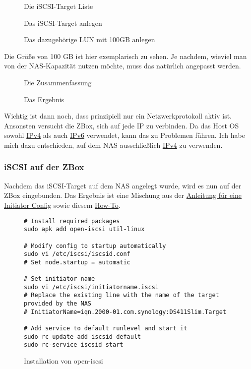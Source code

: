 \documentclass[12pt,a4paper,ngerman]{article}
\newcommand{\jpaimg}[2]{\begin{figure}[H]\centering\fbox{\texttt{[image: \#1]}}\caption{#2}\label{fig:#2}\end{figure}}
\newcommand{\jpacaption}[1]{\caption{#1}\label{fig:#1}}
\begin{document}
\jpaimg{./images/DSM-ISCSI-02.png}{Die iSCSI-Target Liste}

\jpaimg{./images/DSM-ISCSI-03.png}{Das iSCSI-Target anlegen}

\jpaimg{./images/DSM-ISCSI-04.png}{Das dazugehörige LUN mit 100GB anlegen}

Die Größe von 100 GB ist hier exemplarisch zu sehen. Je nachdem, wieviel man
von der NAS-Kapazität nutzen möchte, muss das natürlich angepasst werden.

\jpaimg{./images/DSM-ISCSI-05.png}{Die Zusammenfassung}

\jpaimg{./images/DSM-ISCSI-06.png}{Das Ergebnis}

Wichtig ist dann noch, dass prinzipiell nur ein Netzwerkprotokoll aktiv ist.
Ansonsten versucht die ZBox, sich auf jede IP zu verbinden. Da das Host OS
sowohl \href{https://de.wikipedia.org/wiki/IPv4}{IPv4} als auch
\href{https://de.wikipedia.org/wiki/IPv6}{IPv6} verwendet, kann das zu
Problemen führen. Ich habe mich dazu entschieden, auf dem NAS ausschließlich
\href{https://de.wikipedia.org/wiki/IPv4}{IPv4} zu verwenden.

\subsubsection{iSCSI auf der ZBox}
Nachdem das iSCSI-Target auf dem NAS angelegt wurde, wird es nun auf der ZBox
eingebunden. Das Ergebnis ist eine Mischung aus der
\href{https://wiki.alpinelinux.org/wiki/ISCSI_Raid_and_Clustered_File_Systems}{Anleitung für eine Initiator Config}
sowie diesem
\href{https://kifarunix.com/how-to-install-and-configure-iscsi-storage-server-on-ubuntu-18-04/}{How-To}.

\begin{figure}[H]
    \begin{lstlisting}
# Install required packages
sudo apk add open-iscsi util-linux

# Modify config to startup automatically
sudo vi /etc/iscsi/iscsid.conf
# Set node.startup = automatic

# Set initiator name
sudo vi /etc/iscsi/initiatorname.iscsi
# Replace the existing line with the name of the target provided by the NAS
# InitiatorName=iqn.2000-01.com.synology:DS411Slim.Target

# Add service to default runlevel and start it
sudo rc-update add iscsid default
sudo rc-service iscsid start
    \end{lstlisting}
    \jpacaption{Installation von open-iscsi}
\end{figure}
\end{document}
